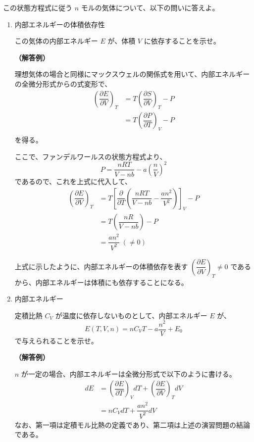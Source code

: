 \documentclass[uplatex,dvipdfmx,a4paper,11pt]{jsarticle}
\begin{document}
\begin{appendix}
\begin{enumerate}
この状態方程式に従う $n$ モルの気体について、以下の問いに答えよ。
\begin{enumerate}
\setlength{\parskip}{0cm} %
\setlength{\itemsep}{0.3cm} %

\item
内部エネルギーの体積依存性

この気体の内部エネルギー $E$ が、体積 $V$ に依存することを示せ。

{\bf （解答例）}

理想気体の場合と同様にマックスウェルの関係式を用いて、内部エネルギーの全微分形式からの式変形で、
\begin{align*}
\left(\dfrac{\partial E}{\partial V} \right)_T 
	&= T \left(\dfrac{\partial S}{\partial V} \right)_T -P \\
	&= T \left(\dfrac{\partial P}{\partial T} \right)_V -P \\
\end{align*}
を得る。

ここで、ファンデルワールスの状態方程式より、
\begin{equation*}
P= \dfrac{nRT}{V - nb} - a \left(\dfrac{n}{V} \right)^2
\end{equation*}
であるので、これを上式に代入して、
\begin{align*}
\left(\dfrac{\partial E}{\partial V} \right)_T 
	&= T \left[\dfrac{\partial}{\partial T} \left(\dfrac {nRT}{V -nb} -\dfrac{an^2}{V^2} \right)\right]_V -P \\
	&= T \left(\dfrac {nR}{V - nb}\right) -P \\
	&= \dfrac{an^2}{V^2} \; (\neq 0)
\end{align*}

上式に示したように、内部エネルギーの体積依存を表す $\left(\dfrac{\partial E}{\partial V} \right)_T \neq 0$ であるから、内部エネルギーは体積にも依存することになる。

\item
内部エネルギー

定積比熱 $C_V$ が温度に依存しないものとして、内部エネルギー $E$ が、
\begin{equation*}
E(T, V, n) = n C_V T - a\dfrac{n^2}{V} + E_0
\end{equation*}
で与えられることを示せ。

{\bf （解答例）}

$n$ が一定の場合、内部エネルギーは全微分形式で以下のように書ける。
\begin{align*}
dE 
	&=\left(\dfrac{\partial E}{\partial T} \right)_V dT+ \left(\dfrac{\partial E}{\partial V} \right)_T dV \\
	&= n C_V dT + \dfrac{an^2}{V^2} dV
\end{align*}
なお、第一項は定積モル比熱の定義であり、第二項は上述の演習問題の結論である。


\end{enumerate}
\end{enumerate}
\end{appendix}
\end{document}
